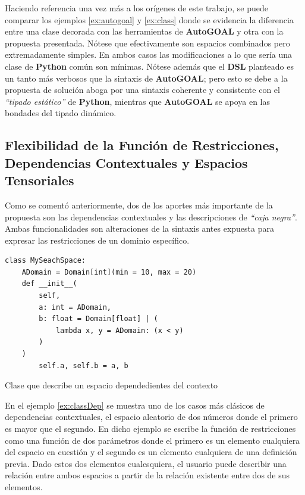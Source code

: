 Haciendo referencia una vez
más a los orígenes de este trabajo, se puede comparar los ejemplos \ref{ex:autogoal} y \ref{ex:class} donde se
evidencia la diferencia entre una clase decorada con las herramientas de {\bf AutoGOAL} y otra con la propuesta
presentada. Nótese que efectivamente son espacios combinados pero extremadamente simples. En ambos casos las
modificaciones a lo que sería una clase de {\bf Python} común son mínimas. Nótese además que el {\bf DSL}
planteado es un tanto más verbosos que la sintaxis de {\bf AutoGOAL}; pero esto se debe a la propuesta de solución
aboga por una sintaxis coherente y consistente con el {\it “tipado estático”} de {\bf Python}, mientras que
    {\bf AutoGOAL} se apoya en las bondades del tipado dinámico.

\subsection{Flexibilidad de la Función de Restricciones, Dependencias Contextuales y Espacios Tensoriales}

Como se comentó anteriormente, dos de los aportes más importante de la propuesta son las dependencias
contextuales y las descripciones de {\it “caja negra”}. Ambas funcionalidades son alteraciones de la sintaxis
antes expuesta para expresar las restricciones de un dominio específico.

\begin{listing}[!ht]
    \begin{verbatim}
class MySeachSpace:
    ADomain = Domain[int](min = 10, max = 20)
    def __init__(
        self, 
        a: int = ADomain,
        b: float = Domain[float] | (
            lambda x, y = ADomain: (x < y)
        )
    )
        self.a, self.b = a, b

    \end{verbatim}
    \caption{Clase que describe un espacio dependedientes del contexto}
    \label{ex:classDep}
\end{listing}


En el ejemplo \ref{ex:classDep} se muestra
uno de los casos más clásicos de dependencias contextuales, el espacio aleatorio de dos números donde el
primero es mayor que el segundo. En dicho ejemplo se escribe la función de restricciones como una función
de dos parámetros donde el primero es un elemento cualquiera del espacio en cuestión y el segundo es un
elemento cualquiera de una definición previa. Dado estos dos elementos cualesquiera, el usuario puede
describir una relación entre ambos espacios a partir de la relación existente entre dos de sus elementos.

